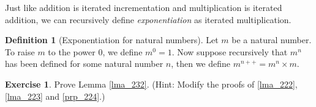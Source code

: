 \documentclass[a4paper, twocolumn]{report}
\newcounter{dummy} \numberwithin{dummy}{section}
\newcounter{exercise} \numberwithin{exercise}{section}
\theoremstyle{definition}
\newtheorem{defn}[dummy]{Definition}
\newtheorem{exc}[exercise]{Exercise}
\theoremstyle{solution}
\newcommand{\dplus}{{+}{+}} %
\begin{document}
\addtocounter{dummy}{1}

Just like addition is iterated incrementation and multiplication is iterated
addition, we can recursively define \textit{exponentiation} as iterated
multiplication.

\begin{defn}[Exponentiation for natural numbers]
  Let $m$ be a natural number. To raise $m$ to the power $0$, we define $m^{0}
  = 1$. Now suppose recursively that $m^{n}$ has been defined for some natural
  number $n$, then we define $m^{n\dplus} = m^{n} \times m$.
\end{defn}

\begin{exc}
  Prove Lemma \ref{lma_232}. (Hint: Modify the proofs of \ref{lma_222},
  \ref{lma_223} and \ref{prp_224}.)
\end{exc}
\end{document}
